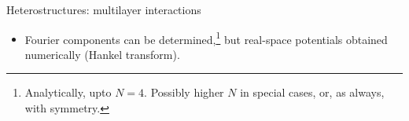 \documentclass[12pt, pdf, hyperref={draft}, usenames, dvipsnames]{beamer}
\begin{document}
%
%
%
%
%
%
%
%
%
%
%
%
%
%


\begin{frame}{Heterostructures: multilayer interactions}
\begin{itemize}
  \begin{figure}[H]
    [\FBwidth]
    {\caption{A tri-layer heterostructure of 2D semiconductors. There are $N$
    layer potentials, and $N(N-1)/2$ inter-layer potentials.}\label{fig:multilayers}}
    {\texttt{[image: figs/multilayers.pdf]}}
  \end{figure}

  \item Fourier components can be
  determined,\footnote{Analytically, upto $N=4$. Possibly higher $N$ in
  special cases, or, as always, with symmetry.} but
  real-space potentials obtained numerically (Hankel transform).
\end{itemize}
\end{frame}
\end{document}
